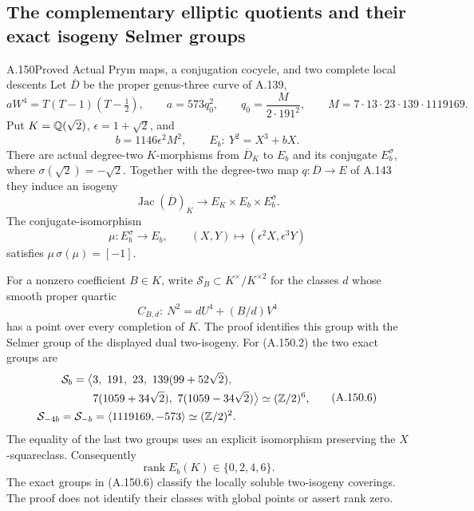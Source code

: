 \subsection[Complementary elliptic quotients and exact isogeny Selmer groups]{The complementary elliptic quotients and their exact isogeny Selmer groups}

\begin{statement}{A.150}{Proved}
{Actual Prym maps, a conjugation cocycle, and two complete local descents}
Let \(\overline D\) be the proper genus-three curve of A.139,
\[
 aW^4=T(T-1)(T-\tfrac12),\qquad
 a=573q_0^2,\qquad q_0=\frac{M}{2\cdot191^2},
 \qquad M=7\cdot13\cdot23\cdot139\cdot1119169.
\tag{A.150.1}
\]
Put \(K=\mathbb Q(\sqrt2)\), \(\epsilon=1+\sqrt2\), and
\[
                 b=1146\epsilon^2M^2,\qquad
                 E_b:\ Y^2=X^3+bX .
\tag{A.150.2}
\]
There are actual degree-two \(K\)-morphisms from
\(\overline D_K\) to \(E_b\) and its conjugate \(E_b^\sigma\),
where \(\sigma(\sqrt2)=-\sqrt2\).  Together with the degree-two
map \(q:\overline D\to E\) of A.143 they induce an isogeny
\[
 \operatorname{Jac}(\overline D)_K
       \longrightarrow E_K\times E_b\times E_b^\sigma .
\tag{A.150.3}
\]
The conjugate-isomorphism
\[
 \mu:E_b^\sigma\longrightarrow E_b,\qquad
             (X,Y)\longmapsto(\epsilon^2X,\epsilon^3Y)
\tag{A.150.4}
\]
satisfies \(\mu\,\sigma(\mu)=[-1]\).

For a nonzero coefficient \(B\in K\), write
\(\mathcal S_B\subset K^\times/K^{\times2}\) for the classes
\(d\) whose smooth proper quartic
\[
                    C_{B,d}:\ N^2=dU^4+(B/d)V^4
\tag{A.150.5}
\]
has a point over every completion of \(K\).
The proof identifies this group with the Selmer group of the
displayed dual two-isogeny.  For (A.150.2) the two exact groups are
\[
 \begin{aligned}
 \mathcal S_b
   =\big\langle&
       3,\ 191,\ 23,\ 139(99+52\sqrt2),\\
       &7(1059+34\sqrt2),\
         7(1059-34\sqrt2)\big\rangle
                   \simeq(\mathbb Z/2)^6,\\
 \mathcal S_{-4b}=\mathcal S_{-b}
   &=\langle1119169,-573\rangle\simeq(\mathbb Z/2)^2 .
 \end{aligned}
\tag{A.150.6}
\]
The equality of the last two groups uses an explicit
isomorphism preserving the \(X\)-squareclass.
Consequently
\[
                \operatorname{rank}E_b(K)\in\{0,2,4,6\}.
\tag{A.150.7}
\]
The exact groups in (A.150.6) classify the locally soluble
two-isogeny coverings.  The proof does not identify their
classes with global points or assert rank zero.
\end{statement}
